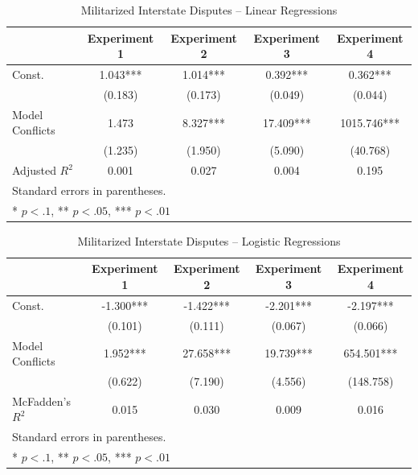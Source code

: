 \begin{table}
  \begin{center}
  \caption{Militarized Interstate Disputes -- Linear Regressions}
  \label{table:mids_linear}
  \begin{tabular}{lcccc}

  \hline
                      & Experiment 1 & Experiment 2 & Experiment 3 & Experiment 4  \\
  \hline
  Const.               & 1.043***     & 1.014***     & 0.392***     & 0.362***      \\
                       & (0.183)      & (0.173)      & (0.049)      & (0.044)       \\
  Model Conflicts      & 1.473        & 8.327***     & 17.409***    & 1015.746***    \\
                       & (1.235)      & (1.950)      & (5.090)      & (40.768)     \\
  \hline
  Adjusted $R^2$     &     0.001      &   0.027      &  0.004       &   0.195 \\            
  \hline
  \hline
  \multicolumn{4}{l}{Standard errors in parentheses.} \\
  \multicolumn{4}{l}{* $p<.1$, ** $p<.05$, *** $p<.01$} \\
  \end{tabular}
  \end{center}
  \tableSpace
\end{table}

\begin{table}
  \begin{center}
  \caption{Militarized Interstate Disputes -- Logistic Regressions}
  \label{table:mid_logits}
  \begin{tabular}{lcccc}
  \hline
                      & Experiment 1 & Experiment 2 & Experiment 3 & Experiment 4  \\
  \hline
  Const.               & -1.300***    & -1.422***    & -2.201***    & -2.197***     \\
                       & (0.101)      & (0.111)      & (0.067)      & (0.066)       \\
  Model Conflicts & 1.952***     & 27.658***    & 19.739***    & 654.501***    \\
                       & (0.622)      & (7.190)      & (4.556)      & (148.758)     \\
  \hline
  McFadden's $R^2$     &  0.015       &  0.030       & 0.009        & 0.016 \\
  \hline
  \hline
  \multicolumn{4}{l}{Standard errors in parentheses.} \\
  \multicolumn{4}{l}{* $p<.1$, ** $p<.05$, *** $p<.01$} \\
  \end{tabular}
  \end{center}
  \tableSpace
\end{table}

